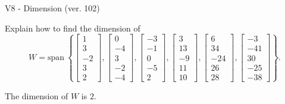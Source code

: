 \begin{exercise}
  \begin{exerciseTitle}V8 - Dimension (ver. 102)\end{exerciseTitle}
  \begin{exerciseStatement}
    Explain how to find the dimension of 
\[W=\mathrm{span}\ \left\{\left[\begin{array}{r}
1 \\
3 \\
-2 \\
3 \\
2
\end{array}\right] , \left[\begin{array}{r}
0 \\
-4 \\
3 \\
-2 \\
-4
\end{array}\right] , \left[\begin{array}{r}
-3 \\
-1 \\
0 \\
-5 \\
2
\end{array}\right] , \left[\begin{array}{r}
3 \\
13 \\
-9 \\
11 \\
10
\end{array}\right] , \left[\begin{array}{r}
6 \\
34 \\
-24 \\
26 \\
28
\end{array}\right] , \left[\begin{array}{r}
-3 \\
-41 \\
30 \\
-25 \\
-38
\end{array}\right]\right\}.\]



  \end{exerciseStatement}
  \begin{exerciseAnswer}
   The dimension of \(W\) is  \(2\).
  


  \end{exerciseAnswer}
\end{exercise}